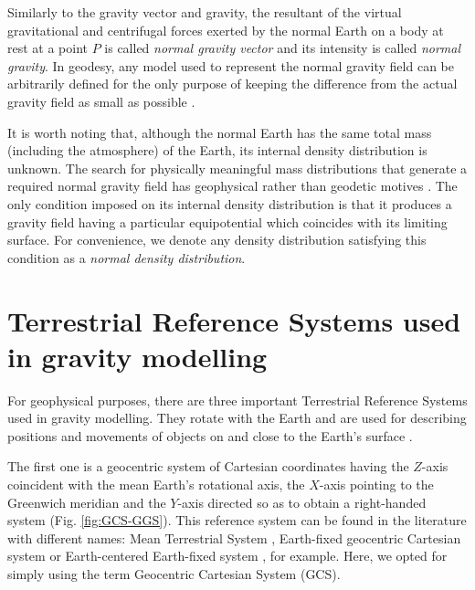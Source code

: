 \documentclass[extra]{gji}
\begin{document}
Similarly to the gravity vector and gravity, 
the resultant of the virtual 
gravitational and centrifugal forces exerted by the normal
Earth on a body at rest at a point $P$ is called 
\textit{normal gravity vector} and its intensity is called 
\textit{normal gravity}.
In geodesy, any model used to represent the normal gravity field
can be arbitrarily defined for the only purpose
of keeping the difference from the actual gravity field as small 
as possible \citep{vanicek1987}.

It is worth noting that, although the normal Earth has the
same total mass (including the atmosphere) of the Earth,
its internal density distribution is unknown.
The search for physically meaningful mass distributions 
that generate a required normal gravity field
has geophysical rather than geodetic motives \citep{marussi1974}.
The only condition imposed on its internal density
distribution is that it produces a gravity field
having a particular equipotential which coincides
with its limiting surface.
For convenience, we denote any density distribution 
satisfying this condition as a \textit{normal density distribution}.


\section{Terrestrial Reference Systems used in gravity modelling}

For geophysical purposes, there are three important Terrestrial Reference Systems used in gravity modelling. 
They rotate with the Earth and are used for describing
positions and movements of objects on and close to the Earth’s surface
\citep{torge2012}.

The first one is a geocentric system of Cartesian coordinates having 
the $Z$-axis coincident with the mean Earth's rotational axis,
the $X$-axis pointing to the Greenwich meridian and the $Y$-axis
directed so as to obtain a right-handed system (Fig. \ref{fig:GCS-GGS}).
This reference system can be found in the literature with different names: Mean Terrestrial System \citep[e.g.,][]{soler1976}, Earth-fixed geocentric Cartesian system \citep[e.g.,][]{torge2012} 
or Earth-centered Earth-fixed system \citep[e.g.,][]{bouman_etal2013}, for example. Here, we opted for simply using the term Geocentric Cartesian System (GCS).
\end{document}
